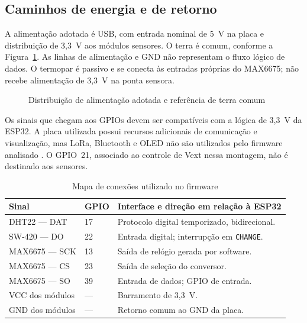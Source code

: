 \subsection{Caminhos de energia e de retorno}

A alimentação adotada é USB, com entrada nominal de 5~V na placa e
distribuição de 3,3~V aos módulos sensores. O terra é comum, conforme
a Figura~\ref{fig:alimentacao}. As linhas de alimentação e GND não representam
o fluxo lógico de dados. O termopar é passivo e se conecta às entradas
próprias do MAX6675; não recebe alimentação de 3,3~V na ponta sensora.

\begin{figure}[htbp]
\centering
\caption{Distribuição de alimentação adotada e referência de terra comum}
\label{fig:alimentacao}
\resizebox{\textwidth}{!}{}
\end{figure}

Os sinais que chegam aos GPIOs devem ser compatíveis com a lógica de
3,3~V da ESP32. A placa utilizada possui recursos adicionais de comunicação
e visualização, mas LoRa, Bluetooth e OLED não são utilizados pelo firmware
analisado \cite{heltecV2,espressif2026}. O GPIO~21, associado ao controle
de Vext nessa montagem, não é destinado aos sensores.

\begin{table}[htbp]
\centering
\caption{Mapa de conexões utilizado no firmware}
\label{tab:pinos}
\begin{tabularx}{\textwidth}{L{4.0cm}L{2.3cm}Y}
\toprule
Sinal & GPIO & Interface e direção em relação à ESP32\\
\midrule
DHT22 --- DAT & 17 & Protocolo digital temporizado, bidirecional.\\
SW-420 --- DO & 22 & Entrada digital; interrupção em \texttt{CHANGE}.\\
MAX6675 --- SCK & 13 & Saída de relógio gerada por software.\\
MAX6675 --- CS & 23 & Saída de seleção do conversor.\\
MAX6675 --- SO & 39 & Entrada de dados; GPIO de entrada.\\
VCC dos módulos & --- & Barramento de 3,3~V.\\
GND dos módulos & --- & Retorno comum ao GND da placa.\\
\bottomrule
\end{tabularx}
\end{table}

